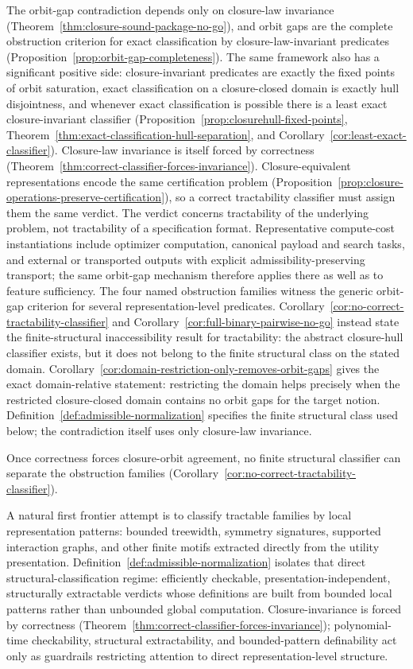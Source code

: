 The orbit-gap contradiction depends only on closure-law invariance (Theorem~\ref{thm:closure-sound-package-no-go}), and orbit gaps are the complete obstruction criterion for exact classification by closure-law-invariant predicates (Proposition~\ref{prop:orbit-gap-completeness}). The same framework also has a significant positive side: closure-invariant predicates are exactly the fixed points of orbit saturation, exact classification on a closure-closed domain is exactly hull disjointness, and whenever exact classification is possible there is a least exact closure-invariant classifier (Proposition~\ref{prop:closurehull-fixed-points}, Theorem~\ref{thm:exact-classification-hull-separation}, and Corollary~\ref{cor:least-exact-classifier}). Closure-law invariance is itself forced by correctness (Theorem~\ref{thm:correct-classifier-forces-invariance}). Closure-equivalent representations encode the same certification problem (Proposition~\ref{prop:closure-operations-preserve-certification}), so a correct tractability classifier must assign them the same verdict. The verdict concerns tractability of the underlying problem, not tractability of a specification format. Representative compute-cost instantiations include optimizer computation, canonical payload and search tasks, and external or transported outputs with explicit admissibility-preserving transport; the same orbit-gap mechanism therefore applies there as well as to feature sufficiency. The four named obstruction families witness the generic orbit-gap criterion for several representation-level predicates. Corollary~\ref{cor:no-correct-tractability-classifier} and Corollary~\ref{cor:full-binary-pairwise-no-go} instead state the finite-structural inaccessibility result for tractability: the abstract closure-hull classifier exists, but it does not belong to the finite structural class on the stated domain. Corollary~\ref{cor:domain-restriction-only-removes-orbit-gaps} gives the exact domain-relative statement: restricting the domain helps precisely when the restricted closure-closed domain contains no orbit gaps for the target notion. Definition~\ref{def:admissible-normalization} specifies the finite structural class used below; the contradiction itself uses only closure-law invariance.

Once correctness forces closure-orbit agreement, no finite structural classifier can separate the obstruction families (Corollary~\ref{cor:no-correct-tractability-classifier}).

A natural first frontier attempt is to classify tractable families by local representation patterns: bounded treewidth, symmetry signatures, supported interaction graphs, and other finite motifs extracted directly from the utility presentation. Definition~\ref{def:admissible-normalization} isolates that direct structural-classification regime: efficiently checkable, presentation-independent, structurally extractable verdicts whose definitions are built from bounded local patterns rather than unbounded global computation. Closure-invariance is forced by correctness (Theorem~\ref{thm:correct-classifier-forces-invariance}); polynomial-time checkability, structural extractability, and bounded-pattern definability act only as guardrails restricting attention to direct representation-level structure.

